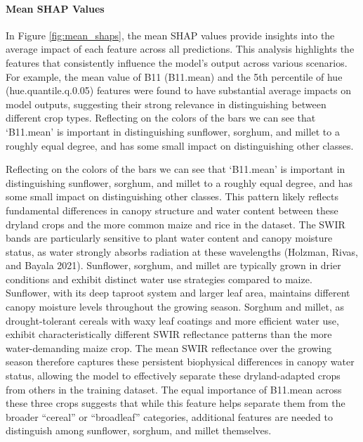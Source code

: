 \documentclass[
  journal,
  twocolumn]{IEEEtran}
\begin{document}
\hypertarget{mean-shap-values}{%
\paragraph{Mean SHAP Values}\label{mean-shap-values}}

In Figure \ref{fig:mean_shaps}, the mean SHAP values provide insights
into the average impact of each feature across all predictions. This
analysis highlights the features that consistently influence the model's
output across various scenarios. For example, the mean value of B11
(B11.mean) and the 5th percentile of hue (hue.quantile.q.0.05) features
were found to have substantial average impacts on model outputs,
suggesting their strong relevance in distinguishing between different
crop types. Reflecting on the colors of the bars we can see that
`B11.mean' is important in distinguishing sunflower, sorghum, and millet
to a roughly equal degree, and has some small impact on distinguishing
other classes.

Reflecting on the colors of the bars we can see that `B11.mean' is
important in distinguishing sunflower, sorghum, and millet to a roughly
equal degree, and has some small impact on distinguishing other classes.
This pattern likely reflects fundamental differences in canopy structure
and water content between these dryland crops and the more common maize
and rice in the dataset. The SWIR bands are particularly sensitive to
plant water content and canopy moisture status, as water strongly
absorbs radiation at these wavelengths (Holzman, Rivas, and Bayala
2021). Sunflower, sorghum, and millet are typically grown in drier
conditions and exhibit distinct water use strategies compared to maize.
Sunflower, with its deep taproot system and larger leaf area, maintains
different canopy moisture levels throughout the growing season. Sorghum
and millet, as drought-tolerant cereals with waxy leaf coatings and more
efficient water use, exhibit characteristically different SWIR
reflectance patterns than the more water-demanding maize crop. The mean
SWIR reflectance over the growing season therefore captures these
persistent biophysical differences in canopy water status, allowing the
model to effectively separate these dryland-adapted crops from others in
the training dataset. The equal importance of B11.mean across these
three crops suggests that while this feature helps separate them from
the broader ``cereal'' or ``broadleaf'' categories, additional features
are needed to distinguish among sunflower, sorghum, and millet
themselves.
\end{document}
